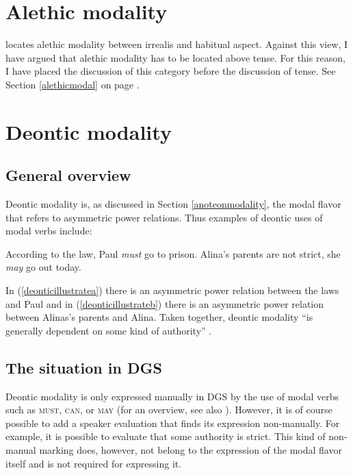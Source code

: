 \section{Alethic modality}
\citet{cinque1999adverbs} locates alethic modality between irrealis and habitual aspect. Against this view, I have argued that alethic modality has to be located above tense. For this reason, I have placed the discussion of this category before the discussion of tense. See Section \ref{alethicmodal} on page \pageref{alethicmodal}.

\section{Deontic modality}\label{deonticmodalsection}


\subsection{General overview}

Deontic modality is, as discussed in Section \ref{anoteonmodality}, the modal flavor that refers to asymmetric power relations. Thus examples of deontic uses of modal verbs include:

\begin{exe}
\ex\label{deonticillustrate}\begin{xlist}
\ex According to the law, Paul \textit{must} go to prison.\label{deonticillustratea}
\ex Alina's parents are not strict, she \textit{may} go out today.\label{deonticillustrateb}
\end{xlist}
\end{exe} 

\noindent In (\ref{deonticillustratea}) there is an asymmetric power relation between the laws and Paul and in (\ref{deonticillustrateb}) there is an asymmetric power relation between Alinas's parents and Alina. Taken together, deontic modality ``is generally dependent on some kind of authority'' \citep[70]{palmer2001mood}.

\subsection{The situation in DGS}
Deontic modality is only expressed manually in DGS by the use of modal verbs such as \textsc{must}, \textsc{can}, or \textsc{may} (for an overview, see also \citealt{pfauquer2007syntaxofnegationandmodals}). However, it is of course possible to add a speaker evaluation that finds its expression non-manually. For example, it is possible to evaluate that some authority is strict. This kind of non-manual marking does, however, not belong to the expression of the modal flavor itself and is not required for expressing it.

